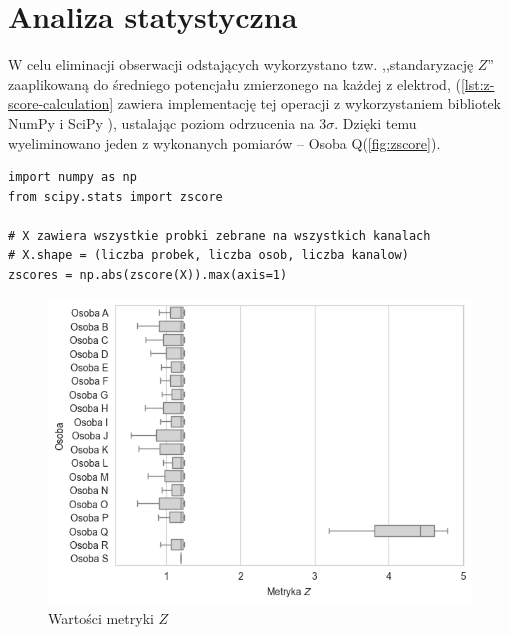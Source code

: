 \documentclass{./assets/wfis}
\begin{document}

\section{Analiza statystyczna}\label{analiza-klasyczna}
W celu eliminacji obserwacji odstających wykorzystano tzw. ,,standaryzację $Z$'' zaaplikowaną do średniego potencjału zmierzonego na każdej z elektrod, (\autoref{lst:z-score-calculation} zawiera implementację tej operacji z wykorzystaniem bibliotek NumPy \cite{harris_array_2020} i SciPy \cite{virtanen_scipy_2020}), ustalając poziom odrzucenia na $3\sigma$. Dzięki temu wyeliminowano jeden z wykonanych pomiarów – Osoba Q(\autoref{fig:zscore}).

\begin{lstlisting}[caption={Obliczanie standardyzacji Z},label={lst:z-score-calculation}]
import numpy as np
from scipy.stats import zscore

# X zawiera wszystkie probki zebrane na wszystkich kanalach
# X.shape = (liczba probek, liczba osob, liczba kanalow)
zscores = np.abs(zscore(X)).max(axis=1)
\end{lstlisting}

\begin{figure}[h!]
    \centering
    \includegraphics[width=0.75\columnwidth]{thesis/assets/zscore.png}
    \caption{Wartości metryki $Z$}
    \label{fig:zscore}
\end{figure}
\end{document}
